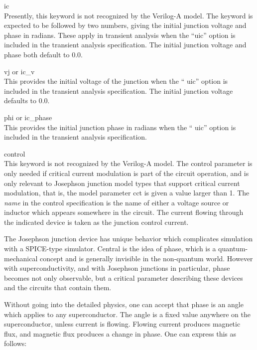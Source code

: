 \begin{description}
\item{\vt ic}\\
Presently, this keyword is not recognized by the Verilog-A model.  The
keyword is expected to be followed by two numbers, giving the initial
junction voltage and phase in radians.  These apply in transient
analysis when the ``{\vt uic}'' option is included in the transient
analysis specification.  The initial junction voltage and phase both
default to 0.0.

\item{{\vt vj} or {\vt ic\_v}}\\
This provides the initial voltage of the junction when the ``{\vt
uic}'' option is included in the transient analysis specification. 
The initial junction voltage defaults to 0.0.

\item{{\vt phi} or {\vt ic\_phase}}\\
This provides the initial junction phase in radians when the ``{\vt
uic}'' option is included in the transient analysis specification.

\item{\vt control}\\
This keyword is not recognized by the Verilog-A model.  The {\vt
control} parameter is only needed if critical current modulation is
part of the circuit operation, and is only relevant to Josephson
junction model types that support critical current modulation, that
is, the model parameter {\vt cct} is given a value larger than 1.  The
{\it name} in the {\vt control} specification is the name of either a
voltage source or inductor which appears somewhere in the circuit. 
The current flowing through the indicated device is taken as the
junction control current.
\end{description}

The Josephson junction device has unique behavior which complicates
simulation with a SPICE-type simulator.  Central is the idea of phase,
which is a quantum-mechanical concept and is generally invisible in
the non-quantum world.  However with superconductivity, and with
Josephson junctions in particular, phase becomes not only observable,
but a critical parameter describing these devices and the circuits
that contain them.

Without going into the detailed physics, one can accept that phase is
an angle which applies to any superconductor.  The angle is a fixed
value anywhere on the superconductor, unless current is flowing. 
Flowing current produces magnetic flux, and magnetic flux produces a
change in phase.  One can express this as follows:

